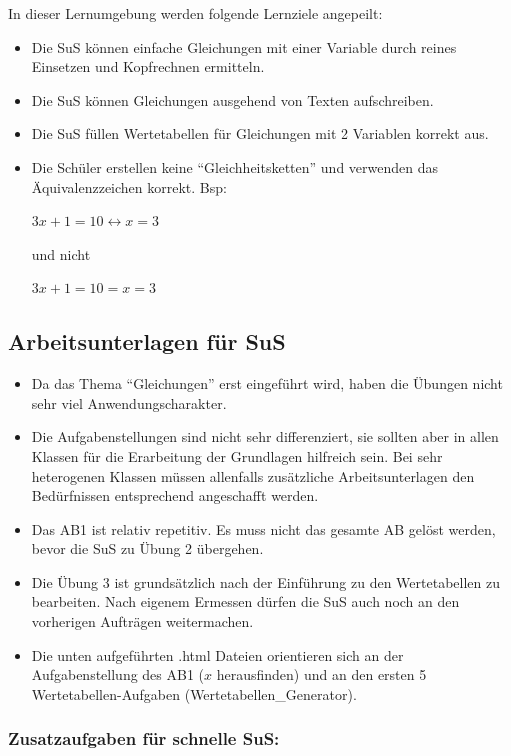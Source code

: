 \documentclass[
  10pt,
  a4paper,
  DIV=11]{scrartcl}
\providecommand{\tightlist}{%
  \setlength{\itemsep}{0pt}\setlength{\parskip}{0pt}}\usepackage{longtable,booktabs,array}
\begin{document}
In dieser Lernumgebung werden folgende Lernziele angepeilt:

\begin{itemize}
\item
  Die SuS können einfache Gleichungen mit einer Variable durch reines
  Einsetzen und Kopfrechnen ermitteln.
\item
  Die SuS können Gleichungen ausgehend von Texten aufschreiben.
\item
  Die SuS füllen Wertetabellen für Gleichungen mit 2 Variablen korrekt
  aus.
\item
  Die Schüler erstellen keine ``Gleichheitsketten'' und verwenden das
  Äquivalenzzeichen korrekt. Bsp:

  \(3x + 1 = 10 \leftrightarrow x = 3\)

  und nicht

  \(3x + 1 = 10 = x = 3\)
\end{itemize}

\subsection{Arbeitsunterlagen für
SuS}\label{arbeitsunterlagen-fuxfcr-sus}

\begin{itemize}
\tightlist
\item
  Da das Thema ``Gleichungen'' erst eingeführt wird, haben die Übungen
  nicht sehr viel Anwendungscharakter.
\item
  Die Aufgabenstellungen sind nicht sehr differenziert, sie sollten aber
  in allen Klassen für die Erarbeitung der Grundlagen hilfreich sein.
  Bei sehr heterogenen Klassen müssen allenfalls zusätzliche
  Arbeitsunterlagen den Bedürfnissen entsprechend angeschafft werden.
\item
  Das AB1 ist relativ repetitiv. Es muss nicht das gesamte AB gelöst
  werden, bevor die SuS zu Übung 2 übergehen.
\item
  Die Übung 3 ist grundsätzlich nach der Einführung zu den Wertetabellen
  zu bearbeiten. Nach eigenem Ermessen dürfen die SuS auch noch an den
  vorherigen Aufträgen weitermachen.
\item
  Die unten aufgeführten .html Dateien orientieren sich an der
  Aufgabenstellung des AB1 (\(x\) herausfinden) und an den ersten 5
  Wertetabellen-Aufgaben (Wertetabellen\_Generator).
\end{itemize}

\subsubsection{Zusatzaufgaben für schnelle
SuS:}\label{zusatzaufgaben-fuxfcr-schnelle-sus}
\end{document}
